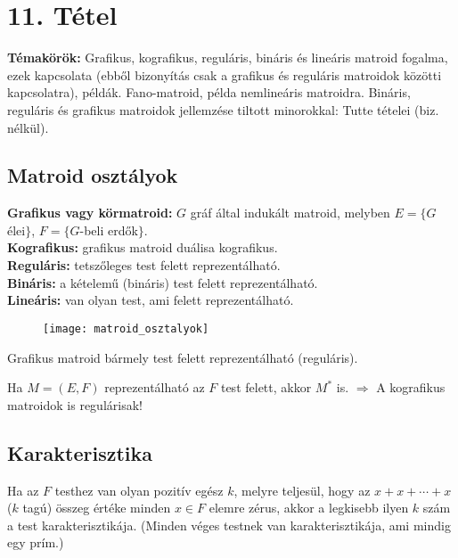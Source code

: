 
\setcounter{chapter}{11}
\chapter*{11. Tétel}

\textbf{Témakörök:} Grafikus, kografikus, reguláris, bináris és lineáris matroid fogalma, ezek kapcsolata (ebből bizonyítás csak a grafikus és reguláris matroidok közötti kapcsolatra), példák. Fano-matroid, példa nemlineáris matroidra. Bináris, reguláris és grafikus matroidok jellemzése tiltott minorokkal: Tutte tételei (biz. nélkül).

\noindent\hrulefill

\section*{Matroid osztályok}
\textbf{Grafikus vagy körmatroid:} $G$ gráf által indukált matroid, melyben $E=\lbrace G$ élei$\rbrace$, $F=\lbrace G$-beli erdők$\rbrace$.\\
\textbf{Kografikus:} grafikus matroid duálisa kografikus.\\
\textbf{Reguláris:} tetszőleges test felett reprezentálható.\\
\textbf{Bináris:} a kételemű (bináris) test felett reprezentálható.\\
\textbf{Lineáris:} van olyan test, ami felett reprezentálható.\\ 

\begin{figure}[h!]
\texttt{[image: matroid\_osztalyok]}
\centering
\end{figure}

\begin{theo}
Grafikus matroid bármely test felett reprezentálható (reguláris).
\end{theo}

\begin{theo}
Ha $M=(E,F)$ reprezentálható az $F$ test felett, akkor $M^{*}$ is. $\Rightarrow$ A kografikus matroidok is regulárisak!
\end{theo}

\section*{Karakterisztika}
Ha az $F$ testhez van olyan pozitív egész $k$, melyre teljesül, hogy az $x+x+\cdots +x$ ($k$ tagú) összeg értéke minden $x\in F$ elemre zérus, akkor a legkisebb ilyen $k$ szám a test karakterisztikája. (Minden véges testnek van karakterisztikája, ami mindig egy prím.)

